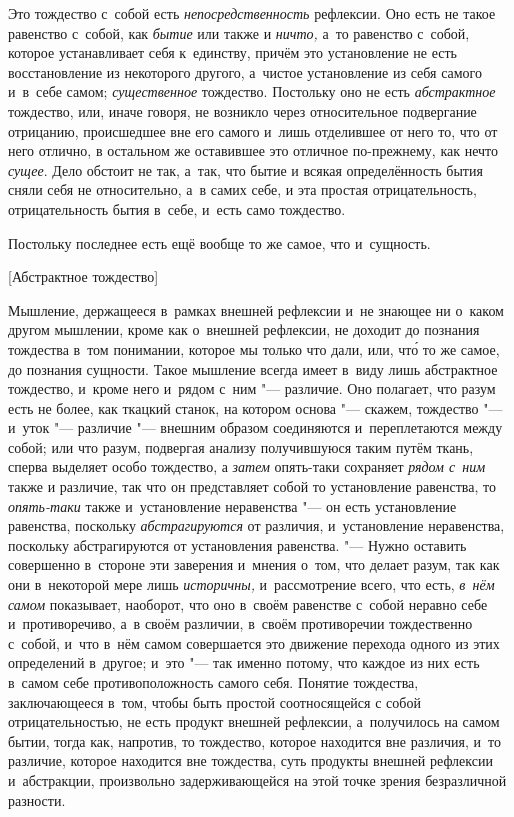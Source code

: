 Это тождество с~собой есть {\em непосредственность}
рефлексии. Оно есть не такое равенство с~собой, как
{\em бытие} или также и
{\em ничто,} а~то равенство с~собой, которое
устанавливает себя к~единству, причём это установление не есть
восстановление из некоторого другого, а~чистое установление из себя самого
и~в~себе самом; {\em существенное} тождество. Постольку
оно не есть {\em абстрактное} тождество, или, иначе
говоря, не возникло через относительное подвергание отрицанию, происшедшее
вне его самого и~лишь отделившее от него то, что от него отлично, в
остальном же оставившее это отличное по-прежнему, как нечто
{\em сущее}. Дело обстоит не так, а~так, что бытие и
всякая определённость бытия сняли себя не относительно, а~в самих себе, и
эта простая отрицательность, отрицательность бытия в~себе, и~есть само
тождество.

Постольку последнее есть ещё вообще то же самое, что и~сущность.

%
  {[Абстрактное тождество]}

Мышление, держащееся в~рамках внешней рефлексии и~не знающее ни о~каком
другом мышлении, кроме как о~внешней рефлексии, не доходит до познания
тождества в~том понимании, которое мы только что дали, или, чт\'{о} то же
самое, до познания сущности. Такое мышление всегда имеет в~виду лишь
абстрактное тождество, и~кроме него и~рядом с~ним "--- различие. Оно полагает,
что разум есть не более, как ткацкий станок, на котором основа "--- скажем,
тождество "--- и~уток "--- различие "--- внешним образом соединяются и~переплетаются
между собой; или что разум, подвергая анализу получившуюся таким путём
ткань, сперва выделяет особо тождество, а {\em затем}
опять-таки сохраняет {\em рядом с~ним} также и
различие, так что он представляет собой то установление равенства, то
{\em опять-таки} также и~установление неравенства "--- он
есть установление равенства, поскольку
{\em абстрагируются} от различия, и~установление
неравенства, поскольку абстрагируются от установления равенства. "--- Нужно
оставить совершенно в~стороне эти заверения и~мнения о~том, что делает
разум, так как они в~некоторой мере лишь
{\em историчны,} и~рассмотрение всего, что есть,
{\em в~нём самом} показывает, наоборот, что оно в~своём
равенстве с~собой неравно себе и~противоречиво, а~в своём различии, в~своём
противоречии тождественно с~собой, и~что в~нём самом совершается это
движение перехода одного из этих определений в~другое; и~это "--- так именно
потому, что каждое из них есть в~самом себе противоположность самого себя.
Понятие тождества, заключающееся в~том, чтобы быть простой соотносящейся с
собой отрицательностью, не есть продукт внешней рефлексии, а~получилось на
самом бытии, тогда как, напротив, то тождество, которое находится вне
различия, и~то различие, которое находится вне тождества, суть продукты
внешней рефлексии и~абстракции, произвольно задерживающейся на этой точке
зрения безразличной разности.

